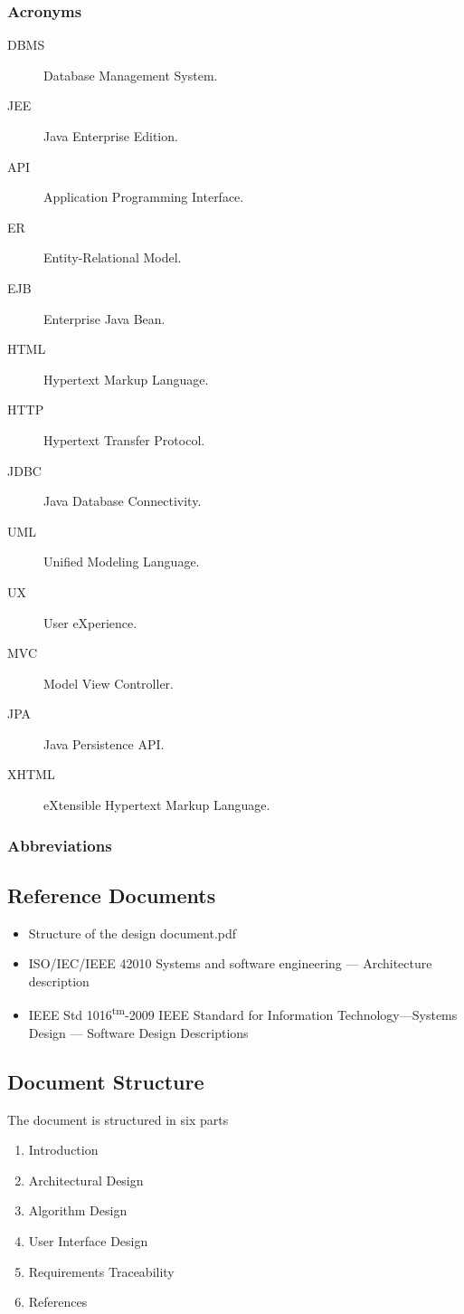 \subsubsection{Acronyms}
\begin{description}
	\item[DBMS] Database Management System.
	\item[JEE] Java Enterprise Edition.
	\item[API]Application Programming Interface.
	\item[ER] Entity-Relational Model.
	\item[EJB] Enterprise Java Bean.
	\item[HTML] Hypertext Markup Language.
	\item[HTTP] Hypertext Transfer Protocol.
	\item[JDBC] Java Database Connectivity.
	\item[UML] Unified Modeling Language.
	\item[UX] User eXperience.
	\item[MVC] Model View Controller.
	\item[JPA] Java Persistence API.
	\item[XHTML] eXtensible Hypertext Markup Language.
\end{description}

\subsubsection{Abbreviations}

\subsection{Reference Documents}
\begin{itemize}
	\item Structure of the design document.pdf
	\item ISO/IEC/IEEE 42010 Systems and software engineering — Architecture description
	\item IEEE Std 1016\textsuperscript{tm}-2009 IEEE Standard for Information Technology—Systems Design — Software Design Descriptions
\end{itemize}

\subsection{Document Structure}
The document is structured in six parts
\begin{enumerate}
	\item Introduction
	\item Architectural Design
	\item Algorithm Design
	\item User Interface Design
	\item Requirements Traceability
	\item References
\end{enumerate}